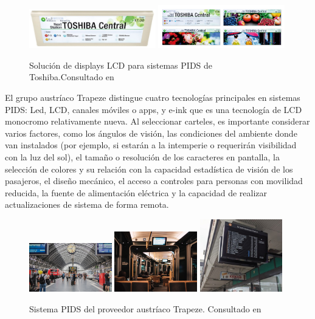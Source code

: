 \begin{figure}[h]
	\centering
	\includegraphics[width=0.49\textwidth]{./Figures/ToshibaPIDS.jpg}
	\includegraphics[width=0.49\textwidth]{./Figures/ToshibaDisplayColorOpciones.jpg}
	\caption{Solución de displays LCD para sistemas PIDS de Toshiba.Consultado en \citep{Toshiba}}
	\label{fig:Toshiba}
\end{figure}


El grupo austríaco Trapeze \citep{Trapeze} distingue cuatro tecnologías principales en sistemas PIDS: Led, LCD, canales móviles o apps, y e-ink que es una tecnología de LCD monocromo relativamente nueva. Al seleccionar carteles, es importante considerar varios factores, como los ángulos de visión, las condiciones del ambiente donde van instalados (por ejemplo, si estarán a la intemperie o requerirán visibilidad con la luz del sol), el tamaño o resolución de los caracteres en pantalla, la selección de colores y su relación con la capacidad estadística de visión de los pasajeros, el diseño mecánico, el acceso a controles para personas con movilidad reducida, la fuente de alimentación eléctrica y la capacidad de realizar actualizaciones de sistema de forma remota. \\ 


\begin{figure}[h]
	\centering
	\includegraphics[width=0.32\textwidth]{./Figures/TrapezeStation.jpg}
	\includegraphics[width=0.32\textwidth]{./Figures/TrapezeOnboard.jpg}
	\includegraphics[width=0.32\textwidth]{./Figures/TrapezeTimetable.jpg}
	\caption{Sistema PIDS del proveedor austríaco Trapeze. Consultado en \citep{Trapeze}}
	\label{fig:Trapeze}
\end{figure}

